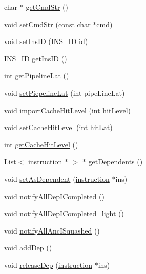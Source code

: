 \begin{DoxyCompactItemize}
\item 
char $\ast$ \hyperlink{classinstruction_a95d2dc965b2b6bb037d31af748b98d30}{getCmdStr} ()
\item 
void \hyperlink{classinstruction_adc61c4f03b740668fa8bf4b3e213f8f3}{setCmdStr} (const char $\ast$cmd)
\item 
void \hyperlink{classinstruction_a3ad74e598e69178490590655303466a1}{setInsID} (\hyperlink{global_2global_8h_a1883c47d0023d0f200e1d86eced6a070}{INS\_\-ID} id)
\item 
\hyperlink{global_2global_8h_a1883c47d0023d0f200e1d86eced6a070}{INS\_\-ID} \hyperlink{classinstruction_a0856c8a7411c298a51cd8d8d5e2f8b12}{getInsID} ()
\item 
int \hyperlink{classinstruction_a6691b4bcb64ecd50e0aea3a0558137d0}{getPipelineLat} ()
\item 
void \hyperlink{classinstruction_a331fb003e92ca7a8b86d95157ecbd122}{setPiepelineLat} (int pipeLineLat)
\item 
void \hyperlink{classinstruction_a94d61291db685cc1c3abb2bb72481b3a}{importCacheHitLevel} (int \hyperlink{cacheCtrl_8cpp_a60025585bccd1055da0bdf1b5877a3fe}{hitLevel})
\item 
void \hyperlink{classinstruction_a060fa401d6b45027f08d827ef2ceb114}{setCacheHitLevel} (int hitLat)
\item 
int \hyperlink{classinstruction_a722d3e54a39d82832a6f9769602ff967}{getCacheHitLevel} ()
\item 
\hyperlink{classList}{List}$<$ \hyperlink{classinstruction}{instruction} $\ast$ $>$ $\ast$ \hyperlink{classinstruction_ad1af63e7f1bfa160b0719027c2a0b8ce}{getDependents} ()
\item 
void \hyperlink{classinstruction_ab2ba6828f1256186a787d933a6ca0868}{setAsDependent} (\hyperlink{classinstruction}{instruction} $\ast$ins)
\item 
void \hyperlink{classinstruction_a4d6726de4186f3010dd064582d4637d4}{notifyAllDepICompleted} ()
\item 
void \hyperlink{classinstruction_a6308dc145beb4a8ee6ccace0ed9f8cdd}{notifyAllDepICompleted\_\-light} ()
\item 
void \hyperlink{classinstruction_abe8f9b353e303a39ab97f1d4bebba101}{notifyAllAncISquashed} ()
\item 
void \hyperlink{classinstruction_aeb756cec429aca99a341f069df268465}{addDep} ()
\item 
void \hyperlink{classinstruction_a9c036772123e1dcf59239cd5fd065f0f}{releaseDep} (\hyperlink{classinstruction}{instruction} $\ast$ins)

\end{DoxyCompactItemize}
